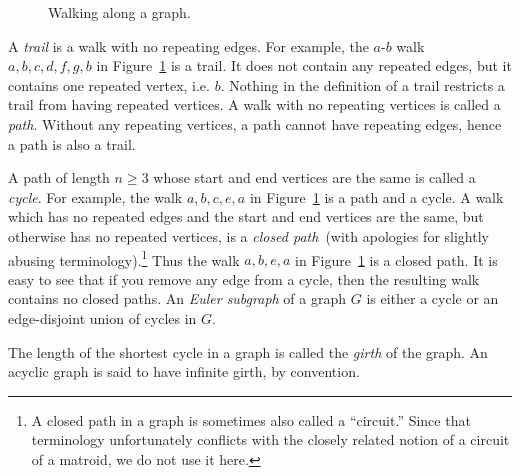 \begin{figure}[!htbp]
\centering
{}
\caption{Walking along a graph.}
\label{fig:introduction:types_of_walks}
\end{figure}

A \emph{trail} is a walk with no repeating edges. For example, the
$a$-$b$ walk $a, b, c, d, f, g, b$ in
Figure~\ref{fig:introduction:types_of_walks} is a trail. It does not
contain any repeated edges, but it contains one repeated vertex,
i.e. $b$. Nothing in the definition of a trail restricts a trail from
having repeated vertices.
A walk with no repeating vertices is called a \emph{path}. Without any
repeating vertices, a path cannot have repeating edges, hence a path
is also a trail.

A path of length $n \geq 3$ whose start and end vertices are the same
is called a \emph{cycle}. For example, the walk $a, b, c, e, a$
in Figure~\ref{fig:introduction:types_of_walks} is a path and a cycle.
A walk which has no repeated edges and the start and end vertices are
the same, but otherwise has no  repeated vertices, is
a \emph{closed path}~(with apologies for slightly abusing
terminology).\footnote{
A closed path in a graph is sometimes also called a ``circuit.'' Since
that terminology unfortunately conflicts with the closely related
notion of a circuit of a matroid, we do not use it here.}
Thus the walk $a, b, e, a$ in
Figure~\ref{fig:introduction:types_of_walks} is a closed path. It is
easy to see that if you remove any edge from a cycle, then the
resulting walk contains no closed paths. An \emph{Euler subgraph} of a
graph $G$ is either a cycle or an edge-disjoint union of cycles in
$G$.

The length of the shortest cycle in a graph is called the \emph{girth}
of the graph. An acyclic graph is said to have infinite girth, by
convention.

